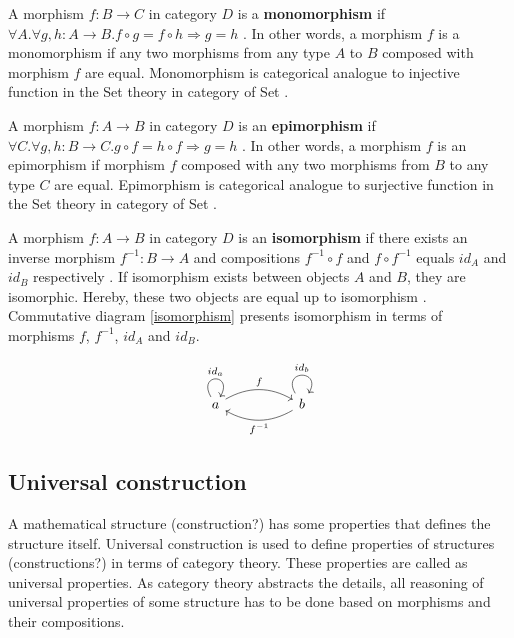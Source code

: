 \documentclass[article]{aaltoseries}
\begin{document}
    A morphism $f: B \rightarrow C$ in category $D$ is a \textbf{monomorphism}
    if $\forall A. \forall g, h: A \rightarrow B. f \circ g = f \circ h
    \Rightarrow g = h$ \cite{barr1990category, pierce1991basic}. In other words,
    a morphism $f$ is a monomorphism if any two morphisms from any type $A$ to
    $B$ composed with morphism $f$ are equal. Monomorphism is categorical
    analogue to injective function in the Set theory in category of Set
    \cite{barr1990category, pierce1991basic}.

    A morphism $f: A \rightarrow B$ in category $D$ is an \textbf{epimorphism}
    if $\forall C. \forall g, h: B \rightarrow C. g \circ f = h \circ f
    \Rightarrow g = h$ \cite{barr1990category, pierce1991basic}. In other words,
    a morphism $f$ is an epimorphism if morphism $f$ composed with any two
    morphisms from $B$ to any type $C$ are equal. Epimorphism is categorical
    analogue to surjective function in the Set theory in category of Set
    \cite{barr1990category, pierce1991basic}.

    A morphism $f: A \rightarrow B$ in category $D$ is an \textbf{isomorphism}
    if there exists an inverse morphism $f^{-1}: B \rightarrow A$ and
    compositions $f^{-1} \circ f$ and $f \circ f^{-1}$ equals $id_A$ and $id_B$
    respectively \cite{barr1990category, pierce1991basic}. If isomorphism exists
    between objects $A$ and $B$, they are isomorphic. Hereby, these two objects
    are equal up to isomorphism \cite{pierce1991basic}. Commutative diagram
    \ref{isomorphism} presents isomorphism in terms of morphisms $f$, $f^{-1}$,
    $id_A$ and $id_B$.

    \begin{equation}
      \label{isomorphism}
      \begin{tikzcd}[row sep=huge, column sep=huge]
        a \arrow[r, bend left, "f"]
        \arrow[loop above, distance=2em, in=60, out=120, "id_a"]
        & b \arrow[l, bend left, "f^{-1}"]
        \arrow[loop above, distance=2em, in=60, out=120, "id_b"]
      \end{tikzcd}
    \end{equation}


  \subsection{Universal construction} 
    A mathematical structure (construction?) has some properties that defines the
    structure itself. Universal construction is used to define properties of
    structures (constructions?) in terms of category theory. These properties are
    called as universal properties. As category theory abstracts the details, all
    reasoning of universal properties of some structure has to be done based on
    morphisms and their compositions.
 
\end{document}
